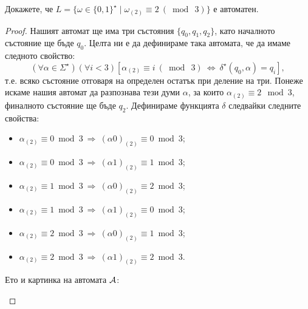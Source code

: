 \begin{problem}
  Докажете, че $L = \{\omega \in \{0,1\}^\star \mid \omega_{(2)} \equiv 2\ (\bmod\ 3)\}$ е автоматен.
\end{problem}
\begin{proof}
  Нашият автомат ще има три състояния $\{q_0,q_1,q_2\}$, като началното състояние ще бъде $q_0$.
  Целта ни е да дефинираме така автомата, че да имаме следното свойство:
  \begin{equation}
    (\forall\alpha\in\Sigma^\star)(\forall i < 3)[\alpha_{(2)} \equiv i\ (\bmod\ 3)\ \Leftrightarrow\ \delta^\star(q_0,\alpha) = q_i],
  \end{equation}
  т.е. всяко състояние отговаря на определен остатък при деление на три.
  Понеже искаме нашия автомат да разпознава тези думи $\alpha$,
  за които $\alpha_{(2)} \equiv 2\mod 3$, финалното състояние ще бъде $q_2$.
  Дефинираме функцията $\delta$ следвайки следните свойства:
  \begin{itemize}
  \item
    $\alpha_{(2)} \equiv 0 \bmod 3\ \Rightarrow\ (\alpha0)_{(2)} \equiv 0 \bmod 3$;
  \item 
    $\alpha_{(2)} \equiv 0 \bmod 3\ \Rightarrow\ (\alpha1)_{(2)} \equiv 1 \bmod 3$;
  \item
    $\alpha_{(2)} \equiv 1 \bmod 3\ \Rightarrow\ (\alpha0)_{(2)} \equiv 2 \bmod 3$;
  \item 
    $\alpha_{(2)} \equiv 1 \bmod 3\ \Rightarrow\ (\alpha1)_{(2)} \equiv 0 \bmod 3$;
  \item
    $\alpha_{(2)} \equiv 2 \bmod 3\ \Rightarrow\ (\alpha0)_{(2)} \equiv 1 \bmod 3$;
  \item 
    $\alpha_{(2)} \equiv 2 \bmod 3\ \Rightarrow\ (\alpha1)_{(2)} \equiv 2 \bmod 3$.
  \end{itemize}
  Ето и картинка на автомата $\mathcal{A}$:
  \begin{figure}[H]
    \begin{center}
\end{center}
\end{figure}
\end{proof}
